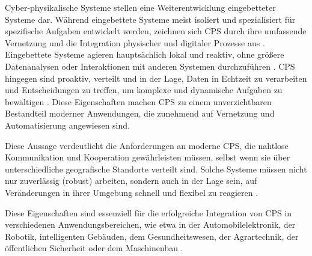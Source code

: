 Cyber-physikalische Systeme stellen eine Weiterentwicklung eingebetteter Systeme  dar. Während eingebettete Systeme meist isoliert und spezialisiert für spezifische Aufgaben entwickelt werden, zeichnen sich CPS durch ihre umfassende Vernetzung und die Integration physischer und digitaler Prozesse aus \cite{Marwedel.2021}. Eingebettete Systeme agieren hauptsächlich lokal und reaktiv, ohne größere Datenanalysen oder Interaktionen mit anderen Systemen durchzuführen \cite{Marwedel.2021}. CPS hingegen sind proaktiv, verteilt und in der Lage, Daten in Echtzeit zu verarbeiten und Entscheidungen zu treffen, um komplexe und dynamische Aufgaben zu bewältigen \cite{Marwedel.2021}. Diese Eigenschaften machen CPS zu einem unverzichtbaren Bestandteil moderner Anwendungen, die zunehmend auf Vernetzung und Automatisierung angewiesen sind.  

Diese Aussage verdeutlicht die Anforderungen an moderne CPS, die nahtlose Kommunikation und Kooperation gewährleisten müssen, selbst wenn sie über unterschiedliche geografische Standorte verteilt sind. Solche Systeme müssen nicht nur zuverlässig (robust) arbeiten, sondern auch in der Lage sein, auf Veränderungen in ihrer Umgebung schnell und flexibel zu reagieren \cite{Council.2015}.  

Diese Eigenschaften sind essenziell für die erfolgreiche Integration von CPS in verschiedenen Anwendungsbereichen, wie etwa in der Automobilelektronik, der Robotik, intelligenten Gebäuden, dem Gesundheitswesen, der Agrartechnik, der öffentlichen Sicherheit oder dem Maschinenbau \cite{Westermann.2016, Council.2015, Wang.2021}.
